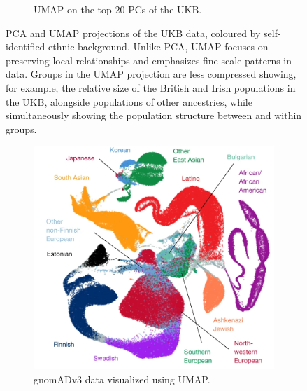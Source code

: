 \documentclass[12pt]{article}
\begin{document}
\begin{figure}[h!]
\begin{subfigure}[b]{0.49\linewidth}
    \caption{UMAP on the top 20 PCs of the UKB.}
    \label{fig:UKB_UMAP}
  \end{subfigure}
  \caption{PCA and UMAP projections of the UKB data, coloured by self-identified ethnic background. Unlike PCA, UMAP focuses on preserving local relationships and emphasizes fine-scale patterns in data. Groups in the UMAP projection are less compressed showing, for example, the relative size of the British and Irish populations in the UKB, alongside populations of other ancestries, while simultaneously showing the population structure between and within groups.}
  \label{fig:UKB}
\end{figure}

\clearpage

\begin{figure}[h!]
  \centering
  \begin{subfigure}[b]{0.49\linewidth}
    \includegraphics[width=\linewidth]{external_images/gnomAD_umap.png}
    \caption{gnomADv3 data visualized using UMAP.}
    \label{fig:gnomAD_UMAP}
  \end{subfigure}
  \begin{subfigure}[b]{0.49\linewidth}

\end{subfigure}
\end{figure}
\end{document}
